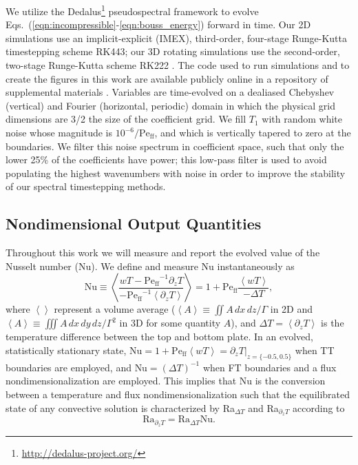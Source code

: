 \documentclass[aps, pre, onecolumn, nofootinbib, notitlepage, groupedaddress, amsfonts, amssymb, amsmath, longbibliography, superscriptaddress]{revtex4-1}
\newcommand{\angles}[1]{\ensuremath{\left\langle #1 \right\rangle}}
\newcommand{\Peff}{\ensuremath{\text{Pe}_{\text{ff}}}}
\begin{document}
We utilize the Dedalus\footnote{\url{http://dedalus-project.org/}} pseudospectral framework \cite{burns&all2016, burns&all2019} to evolve Eqs.~(\ref{eqn:incompressible}-\ref{eqn:bouss_energy}) forward in time.
Our 2D simulations use an implicit-explicit (IMEX), third-order, four-stage Runge-Kutta timestepping scheme RK443; our 3D rotating simulations use the second-order, two-stage Runge-Kutta scheme RK222 \cite{ascher&all1997}. 
The code used to run simulations and to create the figures in this work are available publicly online in a repository of supplemental materials \cite{anders&all2020a_supp}.
Variables are time-evolved on a dealiased Chebyshev (vertical) and Fourier (horizontal, periodic) domain in which the physical grid dimensions are 3/2 the size of the coefficient grid.  
We fill $T_1$ with random white noise whose magnitude is $10^{-6}/\Peff$, and which is vertically tapered to zero at the boundaries.
We filter this noise spectrum in coefficient space, such that only the lower 25\% of the coefficients have power; this low-pass filter is used to avoid populating the highest wavenumbers with noise in order to improve the stability of our spectral timestepping methods.


\subsection{Nondimensional Output Quantities}
\label{sec:ra_nu_relations}
Throughout this work we will measure and report the evolved value of the Nusselt number (Nu).
We define and measure Nu instantaneously as
\begin{equation}
\text{Nu} \equiv \angles{\frac{w T - \Peff^{-1} \partial_z T}{-\Peff^{-1} \angles{\partial_z T}}}
= 1 + \Peff\frac{\angles{w T}}{-\Delta T},
\end{equation}
where $\angles{}$ represent a volume average ($\angles{A} \equiv \iint A\,dx\,dz / \Gamma$ in 2D and $\angles{A} \equiv \iiint A\,dx\,dy\,dz / \Gamma^2$ in 3D for some quantity $A$), and $\Delta T = \angles{\partial_z T}$ is the temperature difference between the top and bottom plate.
In an evolved, statistically stationary state, $\left.\text{Nu} = 1 + \Peff\angles{wT} = \partial_z T\right|_{z = \{-0.5, 0.5\}}$ when TT boundaries are employed, and $\text{Nu} = (\Delta T)^{-1}$ when FT boundaries and a flux nondimensionalization are employed.
This implies that Nu is the conversion between a temperature and flux nondimensionalization such that the equilibrated state of any convective solution is characterized by Ra$_{\Delta T}$ and Ra$_{\partial_z T}$ according to
\begin{equation}
\text{Ra}_{\partial_z T} = \text{Ra}_{\Delta T} \text{Nu}.
\label{eqn:ra_relation}
\end{equation}
\end{document}
